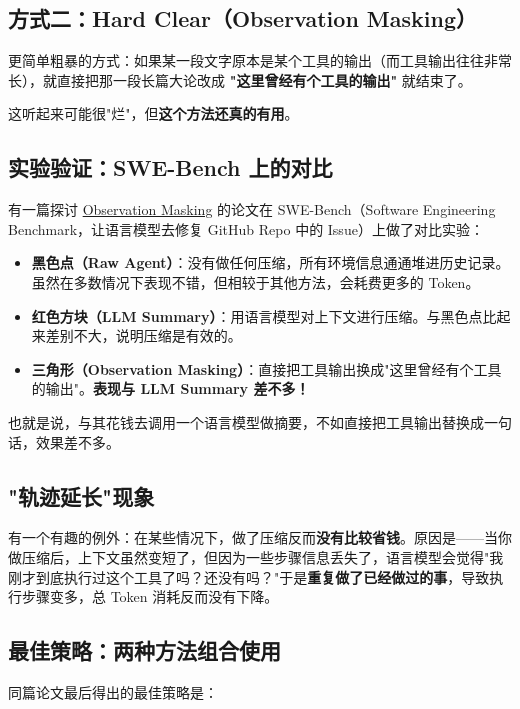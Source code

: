 \documentclass[12pt,a4paper]{article}
\begin{document}
\subsection{方式二：Hard Clear（Observation Masking）}

更简单粗暴的方式：如果某一段文字原本是某个工具的输出（而工具输出往往非常长），就直接把那一段长篇大论改成 \textbf{"这里曾经有个工具的输出"} 就结束了。

这听起来可能很"烂"，但\textbf{这个方法还真的有用}。

\subsection{实验验证：SWE-Bench 上的对比}

有一篇探讨 \href{https://arxiv.org/abs/2508.21433}{Observation Masking} 的论文在 SWE-Bench（Software Engineering Benchmark，让语言模型去修复 GitHub Repo 中的 Issue）上做了对比实验：

\begin{itemize}[leftmargin=2em]
  \item \textbf{黑色点（Raw Agent）}：没有做任何压缩，所有环境信息通通堆进历史记录。虽然在多数情况下表现不错，但相较于其他方法，会耗费更多的 Token。
  \item \textbf{红色方块（LLM Summary）}：用语言模型对上下文进行压缩。与黑色点比起来差别不大，说明压缩是有效的。
  \item \textbf{三角形（Observation Masking）}：直接把工具输出换成"这里曾经有个工具的输出"。\textbf{表现与 LLM Summary 差不多！}
\end{itemize}

也就是说，与其花钱去调用一个语言模型做摘要，不如直接把工具输出替换成一句话，效果差不多。

\subsection{"轨迹延长"现象}

有一个有趣的例外：在某些情况下，做了压缩反而\textbf{没有比较省钱}。原因是——当你做压缩后，上下文虽然变短了，但因为一些步骤信息丢失了，语言模型会觉得"我刚才到底执行过这个工具了吗？还没有吗？"于是\textbf{重复做了已经做过的事}，导致执行步骤变多，总 Token 消耗反而没有下降。

\subsection{最佳策略：两种方法组合使用}

同篇论文最后得出的最佳策略是：
\end{document}
